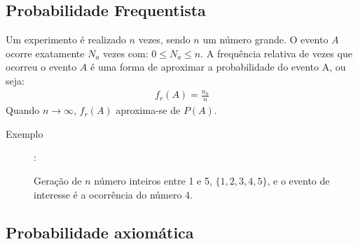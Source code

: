 \documentclass[11pt,a4paper]{book}
\begin{document}
\subsection{Probabilidade Frequentista}

Um experimento é realizado  $n$ vezes, sendo $n$ um número grande. O evento $A$ ocorre exatamente $N_a$ vezes com: $0 \le N_a \le n$. A frequência relativa de vezes que ocorreu o evento $A$ é uma forma de aproximar a probabilidade do evento A, ou seja:
\begin{align}
  f_r (A)= \frac{n_a}{n}
\end{align}
Quando $n \to \infty$, $f_r(A)$ aproxima-se de $P(A)$.
\begin{description}
  \item[Exemplo]: 

    Geração de $n$ número inteiros entre 1 e 5, $\{ 1,2,3,4,5 \}$, e o evento de interesse é a ocorrência do número 4.
\end{description}
\subsection{Probabilidade axiomática}
\end{document}
